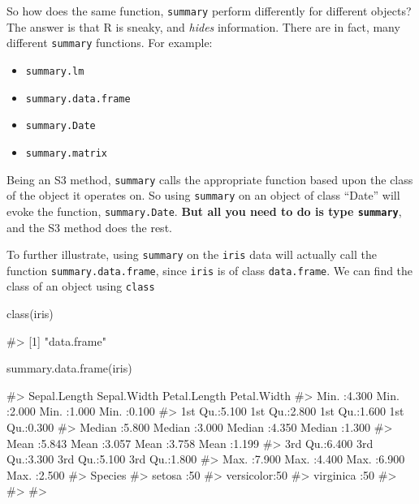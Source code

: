 So how does the same function, \texttt{summary} perform differently for
different objects? The answer is that R is sneaky, and \emph{hides}
information. There are in fact, many different \texttt{summary}
functions. For example:

\begin{itemize}
\tightlist
\item
  \texttt{summary.lm}
\item
  \texttt{summary.data.frame}
\item
  \texttt{summary.Date}
\item
  \texttt{summary.matrix}
\end{itemize}

Being an S3 method, \texttt{summary} calls the appropriate function
based upon the class of the object it operates on. So using
\texttt{summary} on an object of class ``Date'' will evoke the function,
\texttt{summary.Date}. \textbf{But all you need to do is type
\texttt{summary}}, and the S3 method does the rest.

To further illustrate, using \texttt{summary} on the \texttt{iris} data
will actually call the function \texttt{summary.data.frame}, since
\texttt{iris} is of class \texttt{data.frame}. We can find the class of
an object using \texttt{class}

\begin{Schunk}
\begin{Sinput}
class(iris)
\end{Sinput}
\begin{Soutput}
#> [1] "data.frame"
\end{Soutput}
\end{Schunk}

\begin{Schunk}
\begin{Sinput}
summary.data.frame(iris)
\end{Sinput}
\begin{Soutput}
#>   Sepal.Length    Sepal.Width     Petal.Length    Petal.Width   
#>  Min.   :4.300   Min.   :2.000   Min.   :1.000   Min.   :0.100  
#>  1st Qu.:5.100   1st Qu.:2.800   1st Qu.:1.600   1st Qu.:0.300  
#>  Median :5.800   Median :3.000   Median :4.350   Median :1.300  
#>  Mean   :5.843   Mean   :3.057   Mean   :3.758   Mean   :1.199  
#>  3rd Qu.:6.400   3rd Qu.:3.300   3rd Qu.:5.100   3rd Qu.:1.800  
#>  Max.   :7.900   Max.   :4.400   Max.   :6.900   Max.   :2.500  
#>        Species  
#>  setosa    :50  
#>  versicolor:50  
#>  virginica :50  
#>                 
#>                 
#> 
\end{Soutput}
\end{Schunk}

